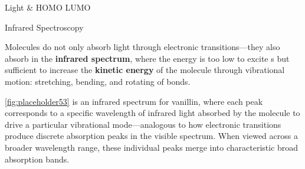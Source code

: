 \documentclass[10pt]{article}
\begin{document}
\begin{core}[label=core:homo_lumo]{Light \& HOMO LUMO}

    \end{core}

    \begin{core}{Infrared Spectroscopy}

      Molecules do not only absorb light through electronic transitions---they also absorb in the \textbf{infrared spectrum}, where the energy is too low to excite s but sufficient to increase the \textbf{kinetic energy} of the molecule through vibrational motion: stretching, bending, and rotating of bonds.


      \autoref{fig:placeholder53} is an infrared spectrum for vanillin, where each peak corresponds to a specific wavelength of infrared light absorbed by the molecule to drive a particular vibrational mode---analogous to how electronic transitions produce discrete absorption peaks in the visible spectrum. When viewed across a broader wavelength range, these individual peaks merge into characteristic broad absorption bands.


    \end{core}
  
\end{document}

